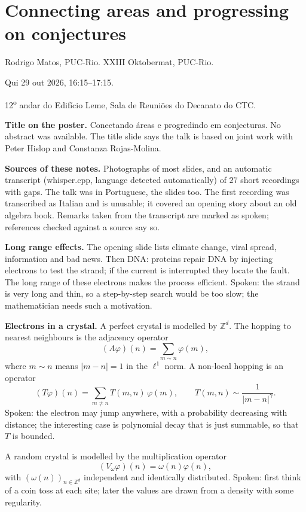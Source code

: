 \section{Connecting areas and progressing on conjectures}
\label{section-matos-long-range}

\noindent
Rodrigo Matos, PUC-Rio.
XXIII Oktobermat, PUC-Rio.

Qui 29 out 2026, 16:15--17:15.

12\textsuperscript{o} andar do Edif\'icio
Leme, Sala de Reuni\~oes do Decanato do CTC.

\medskip\noindent
{\bf Title on the poster.} Conectando
\'areas e
progredindo em conjecturas. No abstract was
available. The title slide says the talk is
based on joint work with Peter Hislop and
Constanza Rojas-Molina.

\medskip\noindent
{\bf Sources of these notes.} Photographs of
most slides, and an automatic transcript
(whisper.cpp, language detected
automatically)
of $27$ short recordings with gaps. The talk
was in Portuguese, the slides too. The first
recording was transcribed as Italian and is
unusable; it covered an opening story about
an old algebra book. Remarks taken from the
transcript are marked as spoken; references
checked against a source say so.

\medskip\noindent
{\bf Long range effects.} The opening slide
lists climate change, viral spread,
information and bad news. Then DNA: proteins
repair DNA by injecting electrons to test the
strand; if the current is interrupted they
locate the fault. The long range of these
electrons makes the process efficient.
Spoken: the strand is very long and thin, so
a step-by-step search would be too slow; the
mathematician needs such a motivation.

\medskip\noindent
{\bf Electrons in a crystal.} A perfect
crystal is modelled by $\mathbb{Z}^d$. The
hopping to nearest neighbours is the
adjacency operator
$$
(A\varphi)(n) = \sum_{m \sim n} \varphi(m),
$$
where $m \sim n$ means $|m-n| = 1$ in the
$\ell^1$ norm. A non-local hopping is an
operator
$$
(T\varphi)(n) = \sum_{m \neq n} T(m,n)\,
\varphi(m),
\qquad
T(m,n) \sim \frac{1}{|m-n|^{\gamma}}.
$$
Spoken: the electron may jump anywhere, with
a probability decreasing with distance; the
interesting case is polynomial decay that is
just summable, so that $T$ is bounded.

A random crystal is modelled by the
multiplication operator
$$
(V_\omega \varphi)(n) = \omega(n)\varphi(n),
$$
with $(\omega(n))_{n \in \mathbb{Z}^d}$
independent and identically distributed.
Spoken: first think of a coin toss at each
site; later the values are drawn from a
density with some regularity.

